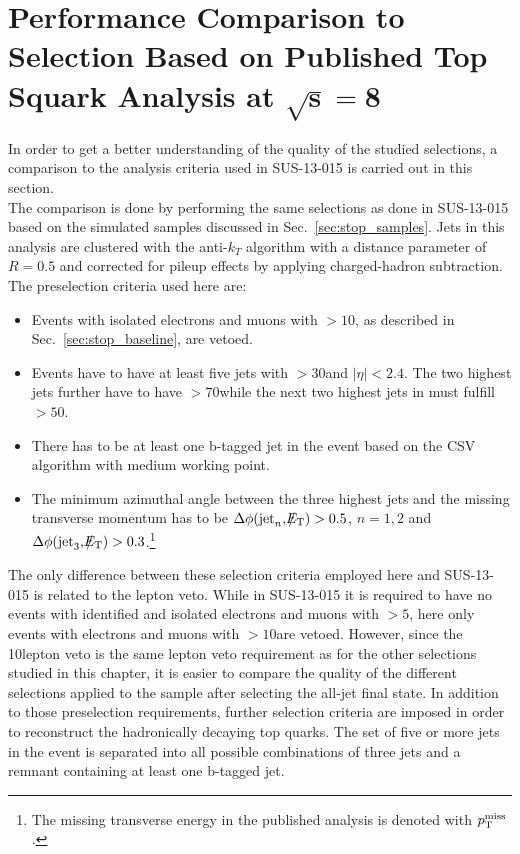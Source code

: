 \section[Performance Comparison to Selection Based on Published Top Squark Analysis]{Performance Comparison to Selection Based on Published Top Squark Analysis at $\mathbf{\sqrt{s} = 8}$\tev}
\label{sec:stop_pub}
In order to get a better understanding of the quality of the studied selections, a comparison to the analysis criteria used in SUS-13-015 is carried out in this section. \\
The comparison is done by performing the same selections as done in SUS-13-015 based on the simulated samples discussed in Sec.~\ref{sec:stop_samples}. Jets in this analysis are clustered with the anti-$k_T$ algorithm with a distance parameter of $R = 0.5$ and corrected for pileup effects by applying charged-hadron subtraction. The preselection criteria used here are:
\begin{itemize}
 \item Events with isolated electrons and muons with \pt$ > 10$\gev, as described in Sec.~\ref{sec:stop_baseline}, are vetoed.
 \item Events have to have at least five jets with \pt$ > 30$\gev and $|\eta| < 2.4$. The two highest \pt jets further have to have \pt$> 70$\gev while the next two highest jets in \pt must fulfill \pt$ > 50$\gev.
 \item There has to be at least one b-tagged jet in the event based on the CSV algorithm with medium working point. 
 \item The minimum azimuthal angle between the three highest jets and the missing transverse momentum has to be $\Delta \phi(\mathrm{jet}_n, \slash\mkern-12mu{E}_{\text{T}}) > 0.5$, $n = 1,2$ and $\Delta \phi(\mathrm{jet}_3, \slash\mkern-12mu{E}_{\text{T}}) > 0.3$.\footnote{The missing transverse energy in the published analysis is denoted with $p_{\text{T}}^\mathrm{miss}$.}%
\end{itemize}
The only difference between these selection criteria employed here and SUS-13-015 is related to the lepton veto. While in SUS-13-015 it is required to have no events with identified and isolated electrons and muons with \pt$> 5$\gev, here only events with electrons and muons with \pt$> 10$\gev are vetoed. However, since the 10\gev lepton veto is the same lepton veto requirement as for the other selections studied in this chapter, it is easier to compare the quality of the different selections applied to the sample after selecting the all-jet final state. In addition to those preselection requirements, further selection criteria are imposed in order to reconstruct the hadronically decaying top quarks. The set of five or more jets in the event is separated into all possible combinations of three jets and a remnant containing at least one b-tagged jet. 

